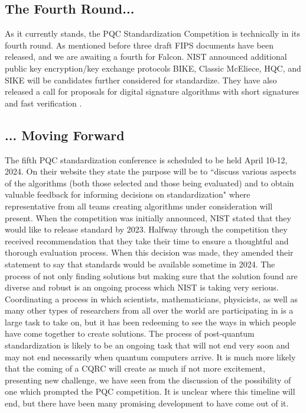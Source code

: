 \subsection{The Fourth Round...}
As it currently stands, the PQC Standardization Competition is technically in its fourth round. As mentioned before three draft FIPS documents have been released, and we are awaiting a fourth for Falcon. NIST announced additional public key encryption/key exchange protocols BIKE, Classic McEliece, HQC, and SIKE will be candidates further considered for standardize. They have also released a call for proposals for digital signature algorithms with short signatures and fast verification \cite{announcingfourth}. 

\subsection{... Moving Forward}
The fifth PQC standardization conference is scheduled to be held April 10-12, 2024. On their website they state the purpose will be to ``discuss various aspects of the algorithms (both those selected and those being evaluated) and to obtain valuable feedback for informing decisions on standardization" \cite{announcingfifth} where representative from all teams creating algorithms under consideration will present. When the competition was initially announced, NIST stated that they would like to release standard by 2023. Halfway through the competition they received recommendation that they take their time to ensure a thoughtful and thorough evaluation process. When this decision was made, they amended their statement to say that standards would be available sometime in 2024. The process of not only finding solutions but making sure that the solution found are diverse and robust is an ongoing process which NIST is taking very serious. Coordinating a process in which scientists, mathematicians, physicists, as well as many other types of researchers from all over the world are participating in is a large task to take on, but it has been redeeming to see the ways in which people have come together to create solutions. The process of post-quantum standardization is likely to be an ongoing task that will not end very soon and may not end necessarily when quantum computers arrive. It is much more likely that the coming of a CQRC will create as much if not more excitement, presenting new challenge, we have seen from the discussion of the possibility of one which prompted the PQC competition. It is unclear where this timeline will end, but there have been many promising development to have come out of it. 